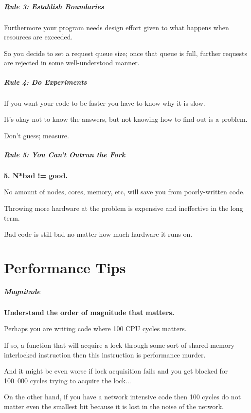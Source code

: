 \begin{frame}
\frametitle{Rule 3: Establish Boundaries}

Furthermore your program needs design effort given to what happens when resources are exceeded. 

So you decide to set a request queue size; once that queue is full, further requests are rejected in some well-understood manner. 


\end{frame}



\begin{frame}
\frametitle{Rule 4: Do Experiments}

If you want your code to be faster you have to know why it is slow. 

It's okay not to know the answers, but not knowing how to find out is a problem. 

Don't guess; measure.

\end{frame}



\begin{frame}
\frametitle{Rule 5: You Can't Outrun the Fork}

\textbf{5. N*bad != good.}

No amount of nodes, cores, memory, etc, will save you from poorly-written code.

Throwing more hardware at the problem is expensive and ineffective in the long term. 

Bad code is still bad no matter how much hardware it runs on. 

\end{frame}

\part{Performance Tips}

\begin{frame}
\partpage
\end{frame}



\begin{frame}
\frametitle{Magnitude}

\textbf{Understand the order of magnitude that matters.} 

Perhaps you are writing code where 100 CPU cycles matters. 

If so, a function that will acquire a lock through some sort of shared-memory interlocked instruction then this instruction is performance murder. 

And it might be even worse if lock acquisition fails and you get blocked for 100~000 cycles trying to acquire the lock... 

On the other hand, if you have a network intensive code then 100 cycles do not matter even the smallest bit because it is lost in the noise of the network.

\end{frame}



